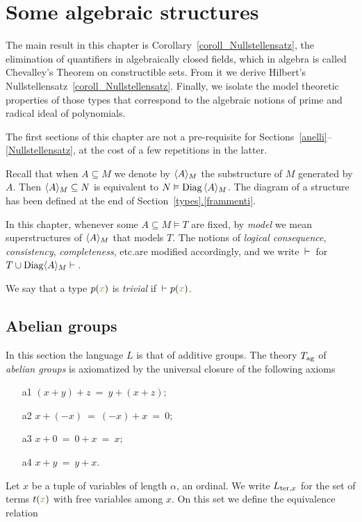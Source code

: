 \documentclass[creche.tex]{subfiles}
\begin{document}
\chapter{Some algebraic structures}
\label{algebraic}

\def\medrel#1{\parbox[b]{6ex}{\hfil$#1$}}
\def\ceq#1#2#3{\parbox[b]{25ex}{$\displaystyle #1$}\medrel{#2}$\displaystyle #3$}

The main result in this chapter is Corollary~\ref{coroll_Nullstellensatz}, the elimination of quantifiers in algebraically closed fields, which in algebra is called Chevalley's Theorem on constructible sets. From it we derive Hilbert's Nullstellensatz~\ref{coroll_Nullstellensatz}. Finally, we isolate the model theoretic properties of those types that correspond to the algebraic notions of prime and radical ideal of polynomials.

The first sections of this chapter are not a pre-requisite for Sections~\ref{anelli}\kern1.5pt--\kern1pt\ref{Nullstellensatz}, at the cost of a few repetitions in the latter.

\begin{notation}\label{notation1}
Recall that when $A\subseteq M$ we denote by \emph{$\langle A\rangle_M$\/} the substructure of $M$ generated by $A$. Then $\langle A\rangle_M\subseteq N$ is equivalent to $N\vDash {\rm Diag}\,\langle A\rangle_M$. The diagram of a structure has been defined at the end of Section~\hyperref[frammenti]{\ref*{types}.\ref*{frammenti}}.

In this chapter, whenever some $A\subseteq M\models T$ are fixed, by \textit{model\/} we mean superstructures of $\langle A\rangle_M$ that models $T$. The notions of \textit{logical consequence}, \textit{consistency}, \textit{completeness}, etc.\@ are modified accordingly, and we write $\,\vdash\,$ for $T\cup{\rm Diag}\langle A\rangle_M\vdash\,$. 

We say that a type $p({\color{brown} x})$ is \emph{trivial\/} if $\,\vdash p({\color{brown} x})$.\QED
\end{notation}

\section{Abelian groups}
\label{gruppi}
In this section the language $L$ is that of additive groups. The theory \emph{$T_{\rm ag}$} of \emph{abelian groups\/} is axiomatized by the universal closure of the following axioms
\begin{itemize}
\item[a1] $(x+y) +z\ =\ y+(x+z)$;
\item[a2] $x+(-x)\ =\ (-x)+x\ =\ 0$;
\item[a3] $x+0\ = \ 0+x\ = \ x$;
\item[a4] $x+y\ =\ y+x$.
\end{itemize}
Let $x$ be a tuple of variables of length $\alpha$, an ordinal. We write $L_{{\rm ter},x}$ for the set of terms $t({\color{brown} x})$ with free variables among $x$. On this set we define the equivalence relation
\end{document}
